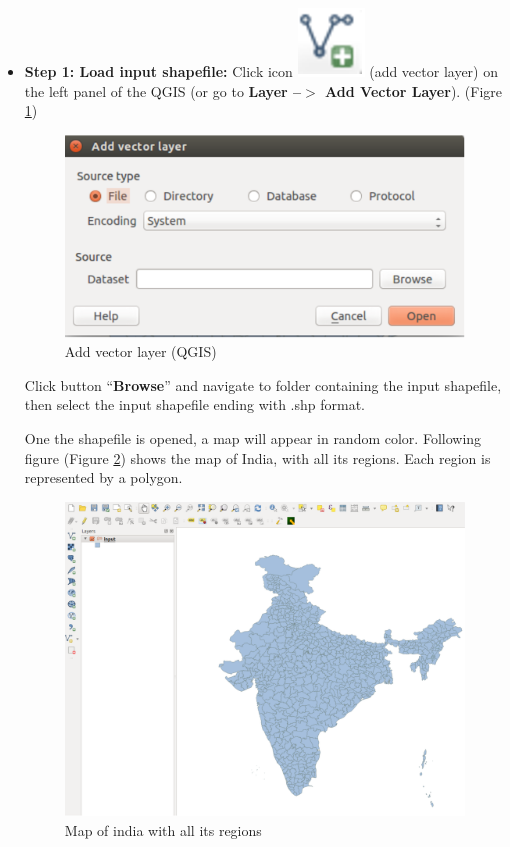\documentclass[12pt,oneside]{memoir}
\newcommand*{\Addvectorlayer}{\includegraphics[scale=0.5]{vectoricon}}%
\newcommand*{\Addvector}[1]{%
\Addvectorlayer %
}
\begin{document}
\begin{itemize}
 \item \textbf{Step 1: Load input shapefile:} Click icon \Addvector{} (add vector layer) on the left panel of the QGIS (or go to \textbf{Layer --$>$ Add Vector Layer}). (Figre \ref{addvector})
 \begin{figure}[H]
\centering
\includegraphics[scale=0.5]{addvector} 
\caption{Add vector layer (QGIS)} 
\label{addvector}
\end{figure}
 Click button ``\textbf{Browse}'' and navigate to folder containing the input shapefile, then select the input shapefile ending with .shp format.
 
 One the shapefile is opened, a map will appear in random color. Following figure (Figure \ref{indianmaprandom}) shows the map of India, with all its regions. Each region is represented by a polygon. 

\begin{figure}[H]
\centering
\includegraphics[scale=0.3]{indianmaprandom} 
\caption{Map of india with all its regions} 
\label{indianmaprandom}
\end{figure}


\end{itemize}
\end{document}
